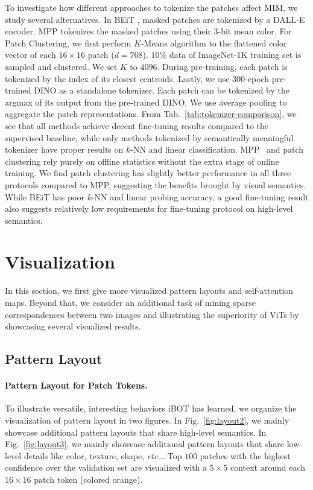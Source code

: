 \documentclass{article} %
\makeatletter
\def\ourmethod{{iBOT}\xspace}
\DeclareRobustCommand\onedot{\futurelet\@let@token\@onedot}
\def\@onedot{\ifx\@let@token.\else.\null\fi\xspace}
\def\etc{\emph{etc}\onedot} \def\vs{\emph{vs}\onedot}
\makeatother
\begin{document}
To investigate how different approaches to tokenize the patches affect MIM, we study several alternatives. In BEiT \citep{beit}, masked patches are tokenized by a DALL-E encoder. MPP \citep{vit} tokenizes the masked patches using their 3-bit mean color. For Patch Clustering, we first perform $K$-Means algorithm to the flattened color vector of each $16 \times 16$ patch ($d=768$). $10\%$ data of ImageNet-1K training set is sampled and clustered. We set $K$ to $4096$. During pre-training, each patch is tokenized by the index of its closest centroids. 
Lastly, we use $300$-epoch pre-trained DINO as a standalone tokenizer. Each patch can be tokenized by the argmax of its output from the pre-trained DINO. We use average pooling to aggregate the patch representations. 
From Tab.~\ref{tab:tokenizer-comparison}, we see that all methods achieve decent fine-tuning results compared to the supervised baseline, while only methods tokenized by semantically meaningful tokenizer have proper results on $k$-NN and linear classification.
MPP~\citep{vit} and patch clustering rely purely on offline statistics without the extra stage of online training. We find patch clustering has slightly better performance in all three protocols compared to MPP, suggesting the benefits brought by visual semantics. While BEiT has poor $k$-NN and linear probing accuracy, a good fine-tuning result also suggests relatively low requirements for fine-tuning protocol on high-level semantics.

         
\section{Visualization}
\label{sec:visualiz}

In this section, we first give more visualized pattern layouts and self-attention maps. Beyond that, we consider an additional task of mining sparse correspondences between two images and illustrating the superiority of ViTs by showcasing several visualized results.

\subsection{Pattern Layout}
\label{sec:patternlayout}

\paragraph{Pattern Layout for Patch Tokens.} To illustrate versatile, interesting behaviors \ourmethod has learned, we organize the visualization of pattern layout in two figures. 
In Fig.~\ref{fig:layout2}, we mainly showcase additional pattern layouts that share high-level semantics. 
In Fig.~\ref{fig:layout3}, we mainly showcase additional pattern layouts that share low-level details like color, texture, shape, \etc. Top $100$ patches with the highest confidence over the validation set are visualized with a $5\times5$ context around each $16\times16$ patch token (colored orange).
\end{document}
